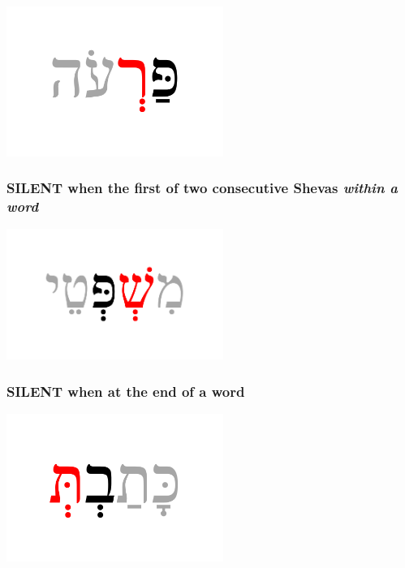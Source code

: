 \documentclass[
]{turabian-researchpaper}
\begin{document}
\begin{center}\includegraphics[width=200pt]{images/03.sheva-shortvowel} \end{center}

\hypertarget{silent-when-the-first-of-two-consecutive-shevas-within-a-word}{%
\subsubsection*{\texorpdfstring{SILENT when the first of two consecutive Shevas \emph{within a word}}{SILENT when the first of two consecutive Shevas within a word}}\label{silent-when-the-first-of-two-consecutive-shevas-within-a-word}}

\begin{center}\includegraphics[width=200pt]{images/03.sheva-firstoftwo} \end{center}

\hypertarget{silent-when-at-the-end-of-a-word}{%
\subsubsection*{SILENT when at the end of a word}\label{silent-when-at-the-end-of-a-word}}

\begin{center}\includegraphics[width=200pt]{images/03.sheva-endofword} \end{center}
\end{document}
